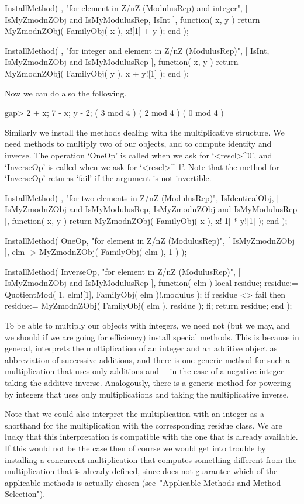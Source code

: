 \begintt
InstallMethod( \+,
    "for element in Z/nZ (ModulusRep) and integer",
    [ IsMyZmodnZObj and IsMyModulusRep, IsInt ],
    function( x, y )
    return MyZmodnZObj( FamilyObj( x ), x![1] + y );
    end );

InstallMethod( \+,
    "for integer and element in Z/nZ (ModulusRep)",
    [ IsInt, IsMyZmodnZObj and IsMyModulusRep ],
    function( x, y )
    return MyZmodnZObj( FamilyObj( y ), x + y![1] );
    end );
\endtt

Now we can do also the following.

\begintt
gap> 2 + x;  7 - x;  y - 2;
( 3 mod 4 )
( 2 mod 4 )
( 0 mod 4 )
\endtt

Similarly we install the methods dealing with the multiplicative
structure.
We need methods to multiply two of our objects,
and to compute identity and inverse.
The operation `OneOp' is called when we ask for `<rescl>^0',
and `InverseOp' is called when we ask for `<rescl>^-1'.
Note that the method for `InverseOp' returns `fail' if the argument
is not invertible.

\begintt
InstallMethod( \*,
    "for two elements in Z/nZ (ModulusRep)",
    IsIdenticalObj,
    [ IsMyZmodnZObj and IsMyModulusRep, IsMyZmodnZObj and IsMyModulusRep ],
    function( x, y )
    return MyZmodnZObj( FamilyObj( x ), x![1] * y![1] );
    end );

InstallMethod( OneOp,
    "for element in Z/nZ (ModulusRep)",
    [ IsMyZmodnZObj ],
    elm -> MyZmodnZObj( FamilyObj( elm ), 1 ) );

InstallMethod( InverseOp,
    "for element in Z/nZ (ModulusRep)",
    [ IsMyZmodnZObj and IsMyModulusRep ],
    function( elm )
    local residue;
    residue:= QuotientMod( 1, elm![1], FamilyObj( elm )!.modulus );
    if residue <> fail then
      residue:= MyZmodnZObj( FamilyObj( elm ), residue );
    fi;
    return residue;
    end );
\endtt

To be able to multiply our objects with integers,
we need not (but we may, and we should if we are going for efficiency)
install special methods.
This is because in general, {\GAP} interprets the multiplication
of an integer and an additive object as abbreviation of successive
additions, and there is one generic method for such a multiplication
that uses only additions and ---in the case of a negative integer---
taking the additive inverse.
Analogously, there is a generic method for powering by integers
that uses only multiplications and taking the multiplicative inverse.

Note that we could also interpret the multiplication with an integer
as a shorthand for the multiplication with the corresponding residue
class.
We are lucky that this interpretation is compatible with the one that
is already available.
If this would not be the case then of course we would get into trouble
by installing a concurrent multiplication that computes something
different from the multiplication that is already defined,
since {\GAP} does not guarantee which of the applicable methods is
actually chosen (see~"Applicable Methods and Method Selection").

